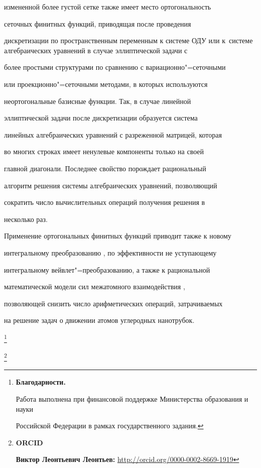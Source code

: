 измененной более густой сетке также имеет место ортогональность

сеточных финитных функций, приводящая после проведения

дискретизации по пространственным переменным к системе ОДУ или к~системе алгебраических уравнений в случае эллиптической задачи с

более простыми структурами по сравнению с вариационно"=сеточными

или проекционно"=сеточными методами, в которых используются

неортогональные базисные функции. Так, в случае линейной

эллиптической задачи после дискретизации образуется система

линейных алгебраических уравнений с разреженной матрицей, которая

во многих строках имеет ненулевые компоненты только на своей

главной диагонали. Последнее свойство порождает рациональный

алгоритм решения системы алгебраических уравнений, позволяющий

сократить число вычислительных операций получения решения в

несколько раз.



Применение ортогональных финитных функций приводит также к новому

интегральному преобразованию \cite{leontiev:19}, по эффективности не уступающему

интегральному вейвлет"=преобразованию, а также к рациональной

математической модели сил межатомного взаимодействия \cite{leontiev:21},

позволяющей снизить число арифметических операций, затрачиваемых

на решение задач о движении атомов углеродных нанотрубок.







\thanks{\textbf{Благодарности.} 

Работа выполнена при финансовой поддержке Министерства образования и науки

Российской Федерации в рамках государственного задания.

}



\thanks{{\bf ORCID}



{\bf Виктор Леонтьевич Леонтьев:} \url{http://orcid.org/0000-0002-8669-1919}

}



